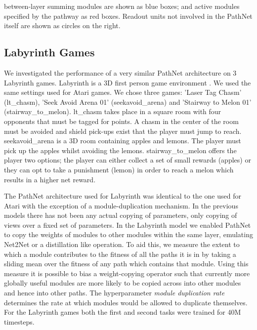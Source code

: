 \documentclass{sig-alternate-05-2015}
\begin{document}
between-layer summing modules are shown as \textcolor{fig2_blue}{blue boxes}; and active modules specified by the pathway as \textcolor{fig2_red}{red boxes}. Readout units not involved in the PathNet itself are shown as circles on the right. \\

\subsection{Labyrinth Games}
We investigated the performance of a very similar PathNet architecture on 3 Labyrinth games. Labyrinth is a 3D first person game environment \cite{jaderberg2016reinforcement}. We used the same settings used for Atari games. We chose three games: 'Laser Tag Chasm' (lt\_chasm), 'Seek Avoid Arena 01' (seekavoid\_arena) and 'Stairway to Melon 01' (stairway\_to\_melon). lt\_chasm takes place in a square room with four opponents that must be tagged for points. A chasm in the center of the room must be avoided and shield pick-ups exist that the player must jump to reach. seekavoid\_arena is a 3D room containing apples and lemons. The player must pick up the apples whilst avoiding the lemons. stairway\_to\_melon offers the player two options; the player can either collect a set of small rewards (apples) or they can opt to take a punishment (lemon) in order to reach a melon which results in a higher net reward. 

The PathNet architecture used for Labyrinth was identical to the one used for Atari with the exception of a module-duplication mechanism. In the previous models there has not been any actual copying of parameters, only copying of views over a fixed set of parameters. In the Labyrinth model we enabled PathNet to copy the weights of modules to other modules within the same layer, emulating Net2Net \cite{chen2015net2net} or a distillation \cite{hinton2015distilling} like operation. To aid this, we measure the extent to which a module contributes to the fitness of all the paths it is in by taking a sliding mean over the fitness of any path which contains that module. Using this measure it is possible to bias a weight-copying operator such that currently more globally useful modules are more likely to be copied across into other modules and hence into other paths. The hyperparameter \textit{module duplication rate} determines the rate at which modules would be allowed to duplicate themselves. For the Labyrinth games both the first and second tasks were trained for 40M timesteps. \\ 
\end{document}
